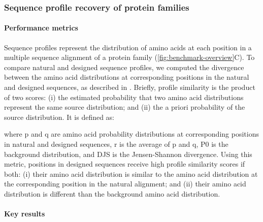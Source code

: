 \subsubsection{Sequence profile recovery of protein families}

\paragraph{Performance metrics}

Sequence profiles represent the distribution of amino acids at each position in a multiple sequence alignment of a protein family (\cref{fig:benchmark-overview}C). To compare natural and designed sequence profiles, we computed the divergence between the amino acid distributions at corresponding positions in the natural and designed sequences, as described in \cite{yona_within_2002}. Briefly, profile similarity is the product of two scores: (i) the estimated probability that two amino acid distributions represent the same source distribution; and (ii) the a priori probability of the source distribution. It is defined as:



where p and q are amino acid probability distributions at corresponding positions in natural and designed sequences, r is the average of p and q, P0 is the background distribution, and DJS is the Jensen-Shannon divergence. Using this metric, positions in designed sequences receive high profile similarity scores if both: (i) their amino acid distribution is similar to the amino acid distribution at the corresponding position in the natural alignment; and (ii) their amino acid distribution is different than the background amino acid distribution.

\paragraph{Key results}

